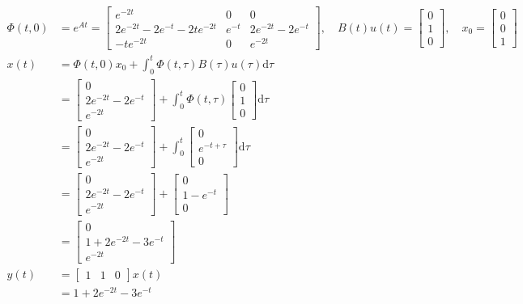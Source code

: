 \documentclass[a4paper,10.5pt]{article}
\newcommand{\de}{\mathrm{d}}
\begin{document}
\begin{align*}
\Phi(t,0) &= e^{At} = \begin{bmatrix}
e^{-2t} & 0 & 0\\
2e^{-2t}-2e^{-t}-2te^{-2t} & e^{-t} & 2e^{-2t}-2e^{-t} \\
-te^{-2t} & 0 & e^{-2t} \end{bmatrix}, \quad B(t)u(t) = \begin{bmatrix}
0 \\ 1 \\ 0
\end{bmatrix}, \quad x_0 = \begin{bmatrix}
0 \\ 0 \\ 1
\end{bmatrix} \\
x(t) &= \Phi(t,0)x_0 + \int_0^t\Phi(t,\tau)B(\tau)u(\tau)\de\tau \\
&=\begin{bmatrix}
0 \\ 2e^{-2t}-2e^{-t} \\ e^{-2t} \end{bmatrix} + \int_0^t\Phi(t,\tau)\begin{bmatrix}
0 \\ 1 \\ 0
\end{bmatrix}\de\tau \\
&=\begin{bmatrix}
0 \\ 2e^{-2t}-2e^{-t} \\ e^{-2t} \end{bmatrix} + \int_0^t\begin{bmatrix}
0 \\ e^{-t+\tau} \\ 0
\end{bmatrix}\de\tau \\
&=\begin{bmatrix}
0 \\ 2e^{-2t}-2e^{-t} \\ e^{-2t} \end{bmatrix} + \begin{bmatrix}
0 \\ 1-e^{-t} \\ 0 \end{bmatrix} \\
&=\begin{bmatrix}
0 \\ 1+2e^{-2t}-3e^{-t} \\ e^{-2t} \end{bmatrix} \\
y(t) &= \begin{bmatrix}1 & 1 & 0\end{bmatrix}x(t) \\
&=1+2e^{-2t}-3e^{-t}
\end{align*}
\end{document}
